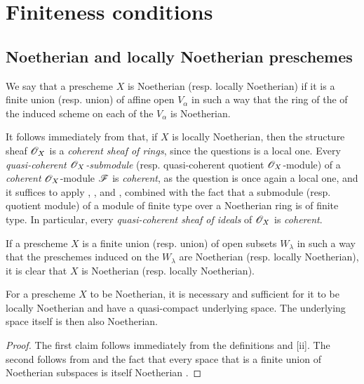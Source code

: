 \section{Finiteness conditions}
\label{section:I.6}

\subsection{Noetherian and locally Noetherian preschemes}
\label{subsection:I.6.1}

\begin{definition}[6.1.1]
\label{I.6.1.1}
We say that a prescheme $X$ is Noetherian (resp. locally Noetherian) if it is a finite union (resp. union) of affine open $V_\alpha$ in such a way that the ring of the of the induced scheme on each of the $V_\alpha$ is Noetherian.
\end{definition}

It follows immediately from  that, if $X$ is locally Noetherian, then the structure sheaf $\mathscr{O}_X$ is a \emph{coherent sheaf of rings}, since the questions is a local one.
Every \emph{quasi-coherent $\mathscr{O}_X$-submodule}
(resp. quasi-coherent quotient $\mathscr{O}_X$-module) of a \emph{coherent} $\mathscr{O}_X$-module $\mathscr{F}$ is \emph{coherent}, as the question is once again a local one, and it suffices to apply , , and , combined with the fact that a submodule (resp. quotient module) of a module of finite type over a Noetherian ring is of finite type.
In particular, every \emph{quasi-coherent sheaf of ideals} of $\mathscr{O}_X$ is \emph{coherent}.

If a prescheme $X$ is a finite union (resp. union) of open subsets $W_\lambda$ in such a way that the preschemes induced on the $W_\lambda$ are Noetherian (resp. locally Noetherian), it is clear that $X$ is Noetherian (resp. locally Noetherian).

\begin{proposition}[6.1.2]
\label{I.6.1.2}
For a prescheme $X$ to be Noetherian, it is necessary and sufficient for it to be locally Noetherian and have a quasi-compact underlying space.
The underlying space itself is then also Noetherian.
\end{proposition}

\begin{proof}
The first claim follows immediately from the definitions and [ii].
The second follows from  and the fact that every space that is a finite union of Noetherian subspaces is itself Noetherian .
\end{proof}

